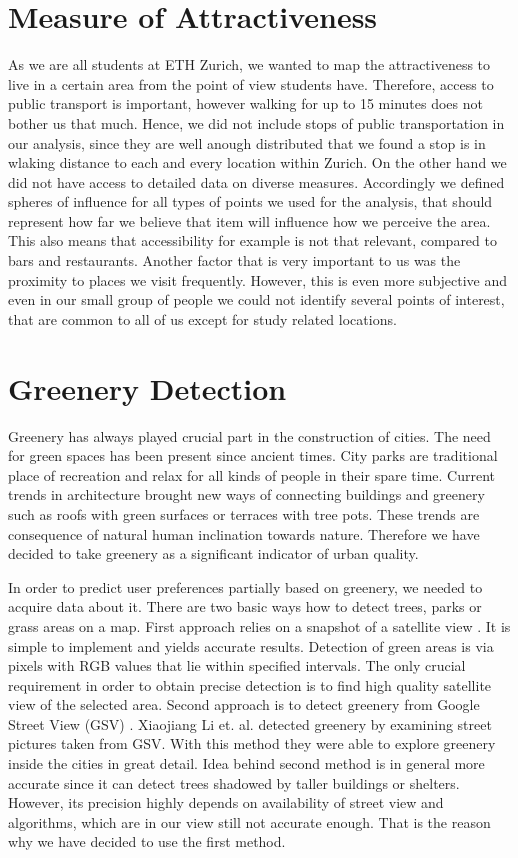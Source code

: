\documentclass[letterpaper]{article}
\begin{document}
\section{Measure of Attractiveness}\label{sec:attractiveness}
As we are all students at ETH Zurich, we wanted to map the attractiveness to live in a certain area from the point of view students have. 
Therefore, access to public transport is important, however walking for up to 15 minutes does not bother us that much. Hence, we did not 
include stops of public transportation in our analysis, since they are well anough distributed that we found a stop is in wlaking distance 
to each and every location within Zurich.
On the other hand we did not have access to detailed data on diverse measures. Accordingly we defined spheres of influence for all types 
of points we used for the analysis, that should represent how far we believe that item will influence how we perceive the area.
This also means that accessibility for example is not that relevant, compared to bars and restaurants. Another factor that is 
very important to us was the proximity to places we visit frequently. However, this is even more subjective and even in our 
small group of people we could not identify several points of interest, that are common to all of us except for study related locations.

\section{Greenery Detection}\label{sec:greenery}
\indent Greenery has always played crucial part in the construction of cities. The need for green spaces has been present since ancient times.
City parks are traditional place of recreation and relax for all kinds of people in their spare time. Current trends in architecture brought new ways of
connecting buildings and greenery such as roofs with green surfaces or terraces with tree pots. These trends are consequence of natural 
human inclination towards nature. Therefore we have decided to take greenery as a significant indicator of urban quality.

\indent In order to predict user preferences partially based on greenery, we needed to acquire data about it. There are two basic ways how to detect trees, 
parks or grass areas on a map. First approach relies on a snapshot of a satellite view \cite{smartCities}. It is simple to implement and yields accurate results. 
Detection of green areas is via pixels with RGB values that lie within specified intervals. The only crucial requirement in order to obtain precise detection 
is to find high quality satellite view of the selected area. 
Second approach is to detect greenery from Google Street View (GSV) \cite{googleView}. Xiaojiang Li et. al. detected greenery by examining street
pictures taken from GSV. With this method they were able to explore greenery inside the cities in great detail. Idea behind second method is in general
more accurate since it can detect trees shadowed by taller buildings or shelters. However, its precision highly depends on availability of street view and
algorithms, which are in our view still not accurate enough. That is the reason why we have decided to use the first method.
\end{document}
